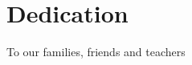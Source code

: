 \chapter*{Dedication}

\begin{center}
	\vspace{100mm}
	To our families, friends and teachers \\
\end{center}

